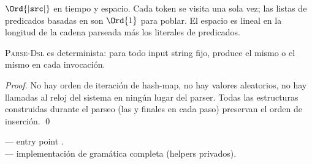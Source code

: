 \begin{complexity}
$\Ord{|\texttt{src}|}$ en tiempo y espacio. Cada token se visita
una sola vez; las listas de predicados basadas en 
son $\Ord{1}$ para poblar. El espacio es lineal en la longitud de
la cadena parseada más los literales de predicados.
\end{complexity}

\begin{theorem}
\textsc{Parse-Dsl} es determinista: para todo input string fijo,
produce el mismo  o el mismo  en
cada invocación.
\end{theorem}

\begin{proof}
No hay orden de iteración de hash-map, no hay valores aleatorios,
no hay llamadas al reloj del sistema en ningún lugar del parser.
Todas las estructuras construidas durante el parseo (las
 y  finales en
cada paso) preservan el orden de inserción. \qed
\end{proof}

\begin{inthecode}
 --- entry point
.\\
 --- implementación de
gramática completa (helpers privados).
\end{inthecode}
